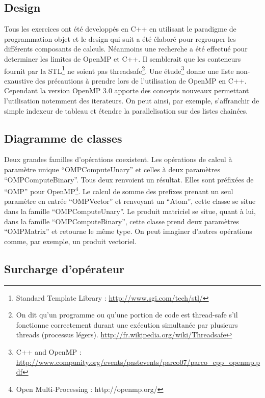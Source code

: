 \documentclass[oneside,11pt]{article}
\begin{document}
\begin{empfile}
\newpage

\section{Design}

Tous les exercices ont été developpés en C++ en utilisant le paradigme de programmation objet et le design qui suit a été élaboré pour regrouper les différents composants de calculs. Néanmoins une recherche a été effectué pour determiner les limites de OpenMP et C++. Il semblerait que les conteneurs fournit par la STL\footnote{Standard Template Library : \url{http://www.sgi.com/tech/stl/}} ne soient pas threadsafe\footnote{On dit qu’un programme ou qu'une portion de code est thread-safe s'il fonctionne correctement durant une exécution simultanée par plusieurs threads (processus légers). \url{http://fr.wikipedia.org/wiki/Threadsafe}}. Une étude\footnote{C++ and OpenMP : \url{http://www.compunity.org/events/pastevents/parco07/parco_cpp_openmp.pdf}} donne une liste non-exaustive des précautions à prendre lors de l’utilisation de OpenMP en C++. Cependant la version OpenMP 3.0 apporte des concepts nouveaux permettant l’utilisation notemment des iterateurs. On peut ainsi, par exemple, s’affranchir de simple indexeur de tableau et étendre la parallelisation sur des listes chainées.

\subsection{Diagramme de classes}

Deux grandes familles d'opérations coexistent. Les opérations de calcul à paramètre unique ``OMPComputeUnary'' et celles à deux paramètres ``OMPComputeBinary''. Tous deux renvoient un résultat. Elles sont préfixées de ``OMP'' pour OpenMP\footnote{Open Multi-Processing : http://openmp.org/}. Le calcul de somme des prefixes prenant un seul paramètre en entrée ``OMPVector'' et renvoyant un ``Atom'', cette classe se situe dans la famille ``OMPComputeUnary''. Le produit matriciel se situe, quant à lui, dans la famille “OMPComputeBinary”, cette classe prend deux paramètres ``OMPMatrix'' et retourne le même type. On peut imaginer d'autres opérations comme, par exemple, un produit vectoriel.

\subsection{Surcharge d'opérateur}


\end{empfile}
\end{document}
